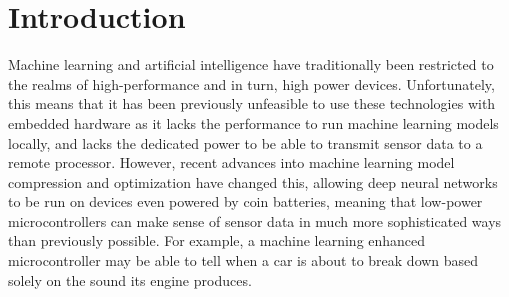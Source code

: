 \setlength{\parskip}{\baselineskip}%
\setlength{\parindent}{0pt}%

\section{Introduction}
%
%
%
%
%
%

Machine learning and artificial intelligence have traditionally been restricted to the realms of high-performance and in turn, high power devices.
Unfortunately, this means that it has been previously unfeasible to use these technologies with embedded hardware as it lacks the performance to run machine learning models locally, and lacks the dedicated power to be able to transmit sensor data to a remote processor.
However, recent advances into machine learning model compression and optimization have changed this, allowing deep neural networks to be run on devices even powered by coin batteries, meaning that low-power microcontrollers can make sense of sensor data in much more sophisticated ways than previously possible.
For example, a machine learning enhanced microcontroller may be able to tell when a car is about to break down based solely on the sound its engine produces.

